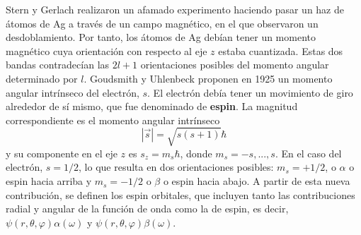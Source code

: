 Stern y Gerlach realizaron un afamado experimento haciendo pasar un 
haz de átomos de Ag a través de un campo magnético, en el que observaron
un desdoblamiento. Por tanto, los átomos de Ag debían tener un momento
magnético cuya orientación con respecto al eje $z$ estaba cuantizada. 
Estas dos bandas contradecían las $2l+1$ orientaciones posibles del
momento angular determinado por $l$. Goudsmith y Uhlenbeck proponen 
en 1925 un momento angular intrínseco del electrón, $s$. El electrón 
debía tener un movimiento de giro alrededor de sí mismo, que fue 
denominado de \textbf{espin}. La magnitud correspondiente es el momento 
angular intrínseco 
\begin{equation}
    |\vec{s}|=\sqrt{s(s+1)}\hbar
\end{equation}
y su componente en el eje $z$ es $s_z=m_s\hbar$, donde $m_s=-s,...,s$.
En el caso del electrón, $s=1/2$, lo que resulta en dos orientaciones
posibles: $m_s=+1/2$, o $\alpha$ o espin hacia arriba y $m_s=-1/2$ o
$\beta$ o espin hacia abajo. A partir de esta nueva contribución,
se definen los espin orbitales, que incluyen tanto las contribuciones
radial y angular de la función de onda como la de espin, es decir,
$\psi(r,\theta,\varphi)\alpha(\omega)$ y 
$\psi(r,\theta,\varphi)\beta(\omega)$.